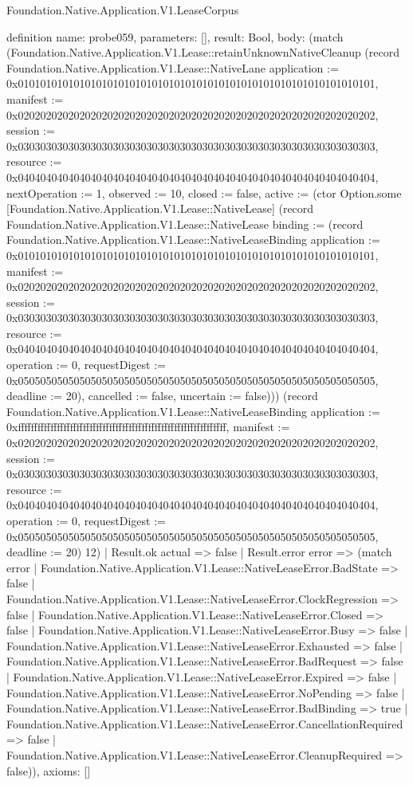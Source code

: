 \begin{lexlean}{Foundation.Native.Application.V1.LeaseCorpus}
\begin{semanticmodule}
definition{
  name: probe059,
  parameters: [],
  result: Bool,
  body: (match (Foundation.Native.Application.V1.Lease::retainUnknownNativeCleanup (record Foundation.Native.Application.V1.Lease::NativeLane {application := 0x0101010101010101010101010101010101010101010101010101010101010101, manifest := 0x0202020202020202020202020202020202020202020202020202020202020202, session := 0x0303030303030303030303030303030303030303030303030303030303030303, resource := 0x0404040404040404040404040404040404040404040404040404040404040404, nextOperation := 1, observed := 10, closed := false, active := (ctor Option.some [Foundation.Native.Application.V1.Lease::NativeLease] (record Foundation.Native.Application.V1.Lease::NativeLease {binding := (record Foundation.Native.Application.V1.Lease::NativeLeaseBinding {application := 0x0101010101010101010101010101010101010101010101010101010101010101, manifest := 0x0202020202020202020202020202020202020202020202020202020202020202, session := 0x0303030303030303030303030303030303030303030303030303030303030303, resource := 0x0404040404040404040404040404040404040404040404040404040404040404, operation := 0, requestDigest := 0x0505050505050505050505050505050505050505050505050505050505050505, deadline := 20}), cancelled := false, uncertain := false}))}) (record Foundation.Native.Application.V1.Lease::NativeLeaseBinding {application := 0xffffffffffffffffffffffffffffffffffffffffffffffffffffffffffffffff, manifest := 0x0202020202020202020202020202020202020202020202020202020202020202, session := 0x0303030303030303030303030303030303030303030303030303030303030303, resource := 0x0404040404040404040404040404040404040404040404040404040404040404, operation := 0, requestDigest := 0x0505050505050505050505050505050505050505050505050505050505050505, deadline := 20}) 12)
    | Result.ok actual => false
    | Result.error error => (match error
      | Foundation.Native.Application.V1.Lease::NativeLeaseError.BadState => false
      | Foundation.Native.Application.V1.Lease::NativeLeaseError.ClockRegression => false
      | Foundation.Native.Application.V1.Lease::NativeLeaseError.Closed => false
      | Foundation.Native.Application.V1.Lease::NativeLeaseError.Busy => false
      | Foundation.Native.Application.V1.Lease::NativeLeaseError.Exhausted => false
      | Foundation.Native.Application.V1.Lease::NativeLeaseError.BadRequest => false
      | Foundation.Native.Application.V1.Lease::NativeLeaseError.Expired => false
      | Foundation.Native.Application.V1.Lease::NativeLeaseError.NoPending => false
      | Foundation.Native.Application.V1.Lease::NativeLeaseError.BadBinding => true
      | Foundation.Native.Application.V1.Lease::NativeLeaseError.CancellationRequired => false
      | Foundation.Native.Application.V1.Lease::NativeLeaseError.CleanupRequired => false)),
  axioms: []
}


\end{semanticmodule}
\end{lexlean}
